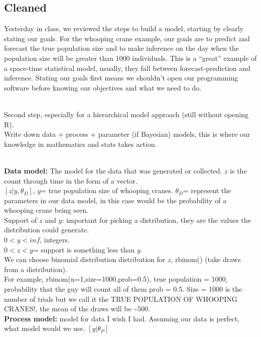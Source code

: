 \documentclass[
]{book}
\begin{document}
\hypertarget{cleaned-1}{%
\subsection{Cleaned}\label{cleaned-1}}

Yesterday in class, we reviewed the steps to build a model, starting by clearly stating our goals. For the whooping crane example, our goals are to predict and forecast the true population size and to make inference on the day when the population size will be greater than 1000 individuals. This is a ``great'' example of a space-time statistical model, usually, they fall between forecast-prediction and inference. Stating our goals first means we shouldn't open our programming software before knowing our objectives and what we need to do.\\
\strut \\
Second step, especially for a hierarchical model approach (still without opening R).\\
Write down data + process + parameter (if Bayesian) models, this is where our knowledge in mathematics and stats takes action.\\
\strut \\
\textbf{Data model:} The model for the data that was generated or collected. \(z\) is the count through time in the form of a vector.\\
\([z|y, \theta_D]\), \(y\)= true population size of whooping cranes. \(\theta_D\)= represent the parameters in our data model, in this case would be the probability of a whooping crane being seen.\\
Support of \(z\) and \(y\): important for picking a distribution, they are the values the distribution could generate.\\
\(0< y < inf\), integers.\\
\(0 < z < y\)= support is something less than \(y\).\\
We can choose binomial distribution distribution for \(z\), rbinom() (take draws from a distribution).\\
For example, rbinom(n=1,size=1000,prob=0.5), true population = 1000, probability that the guy will count all of them prob = 0.5. Size = 1000 is the number of trials but we call it the TRUE POPULATION OF WHOOPING CRANES!, the mean of the draws will be \textasciitilde500.\\
\textbf{Process model:} model for data I wish I had. Assuming our data is perfect, what model would we use. \([y|\theta_P]\)\\
\end{document}
